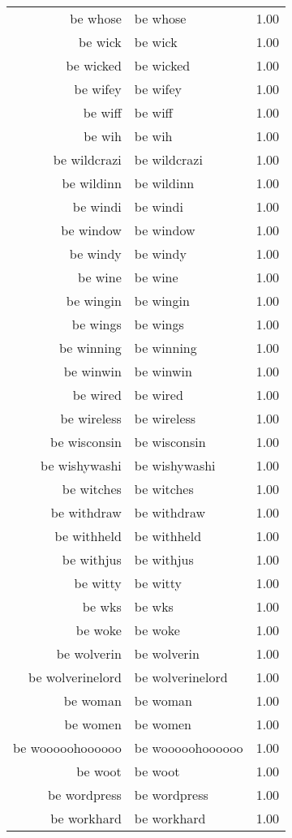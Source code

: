 \begin{table}[ht]
\begin{tabular}{rlr}
  be whose & be whose & 1.00 \\ 
  be wick & be wick & 1.00 \\ 
  be wicked & be wicked & 1.00 \\ 
  be wifey & be wifey & 1.00 \\ 
  be wiff & be wiff & 1.00 \\ 
  be wih & be wih & 1.00 \\ 
  be wildcrazi & be wildcrazi & 1.00 \\ 
  be wildinn & be wildinn & 1.00 \\ 
  be windi & be windi & 1.00 \\ 
  be window & be window & 1.00 \\ 
  be windy & be windy & 1.00 \\ 
  be wine & be wine & 1.00 \\ 
  be wingin & be wingin & 1.00 \\ 
  be wings & be wings & 1.00 \\ 
  be winning & be winning & 1.00 \\ 
  be winwin & be winwin & 1.00 \\ 
  be wired & be wired & 1.00 \\ 
  be wireless & be wireless & 1.00 \\ 
  be wisconsin & be wisconsin & 1.00 \\ 
  be wishywashi & be wishywashi & 1.00 \\ 
  be witches & be witches & 1.00 \\ 
  be withdraw & be withdraw & 1.00 \\ 
  be withheld & be withheld & 1.00 \\ 
  be withjus & be withjus & 1.00 \\ 
  be witty & be witty & 1.00 \\ 
  be wks & be wks & 1.00 \\ 
  be woke & be woke & 1.00 \\ 
  be wolverin & be wolverin & 1.00 \\ 
  be wolverinelord & be wolverinelord & 1.00 \\ 
  be woman & be woman & 1.00 \\ 
  be women & be women & 1.00 \\ 
  be wooooohoooooo & be wooooohoooooo & 1.00 \\ 
  be woot & be woot & 1.00 \\ 
  be wordpress & be wordpress & 1.00 \\ 
  be workhard & be workhard & 1.00 \\ 

\end{tabular}
\end{table}
